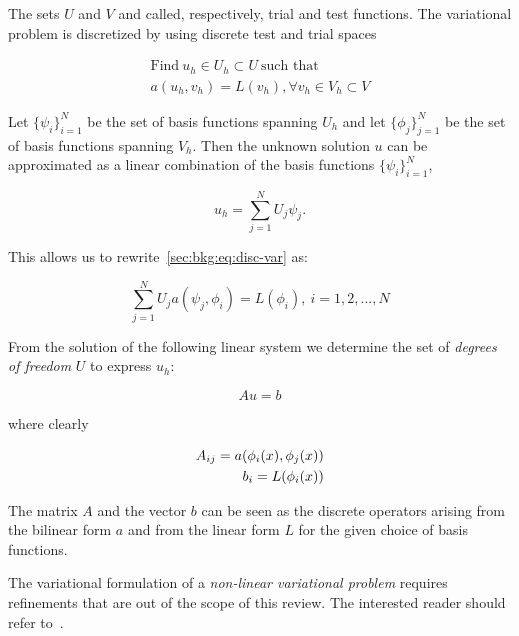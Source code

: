 The sets $U$ and $V$ and called, respectively, trial and test functions. The variational problem is discretized by using discrete test and trial spaces

\begin{equation}
\label{sec:bkg:eq:disc-var}
\begin{split}
\text{Find}\ u_h \in U_h \subset U\ \text{such that} \\
a(u_h, v_h) = L(v_h), \forall v_h \in V_h \subset V
\end{split}
\end{equation}

Let $\lbrace \psi_i \rbrace_{i=1}^N$ be the set of basis functions spanning $U_h$ and let $\lbrace \phi_j \rbrace_{j=1}^{N}$ be the set of basis functions spanning $V_h$. Then the unknown solution $u$ can be approximated as a linear combination of the basis functions $\lbrace \psi_i \rbrace_{i=1}^N$,

\begin{equation}
u_h = \sum_{j=1}^N U_j \psi_j.
\end{equation}

This allows us to rewrite~\ref{sec:bkg:eq:disc-var} as:

\begin{equation}
\sum_{j=1}^N U_j a(\psi_j, \phi_i) = L(\phi_i),\ i=1,2,...,N
\end{equation}

From the solution of the following linear system we determine the set of {\em degrees of freedom} $U$ to express $u_h$:

\begin{equation}
Au = b
\end{equation}

where clearly

\begin{equation}
\label{sec:bkg:eq:disc-op}
\centering
\begin{split}
A_{ij} = a(\phi_i(x), \phi_j(x)) \\
b_i = L(\phi_i(x))
\end{split}
\end{equation}

The matrix $A$ and the vector $b$ can be seen as the discrete operators arising from the bilinear form $a$ and from the linear form $L$ for the given choice of basis functions.

The variational formulation of a {\em non-linear variational problem} requires refinements that are out of the scope of this review. The interested reader should refer to~\cite{brenner-and-scott}.

